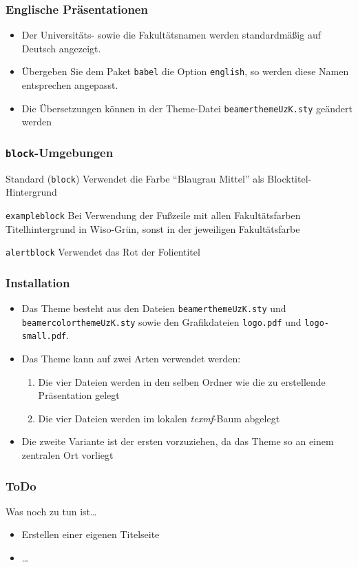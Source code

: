 \documentclass{beamer}
\begin{document}
\begin{frame}
  \frametitle{Englische Präsentationen}
  \begin{itemize}
  \item Der Universitäts- sowie die Fakultätsnamen werden
    standardmäßig auf Deutsch angezeigt.
  \item Übergeben Sie dem Paket \texttt{babel} die Option
    \texttt{english}, so werden diese Namen entsprechen angepasst.
  \item Die Übersetzungen können in der Theme-Datei
    \texttt{beamerthemeUzK.sty} geändert werden
  \end{itemize}

\end{frame}

\begin{frame}
  \frametitle{\texttt{block}-Umgebungen}
  \begin{block}{Standard (\texttt{block})}
    Verwendet die Farbe "`Blaugrau Mittel"' als Blocktitel-Hintergrund
  \end{block}

  \begin{exampleblock}{\texttt{exampleblock}}
    Bei Verwendung der Fußzeile mit allen Fakultätsfarben
    Titelhintergrund in Wiso-Grün, sonst in der jeweiligen
    Fakultätsfarbe
  \end{exampleblock}

  \begin{alertblock}{\texttt{alertblock}}
    Verwendet das Rot der Folientitel
  \end{alertblock}

\end{frame}


\begin{frame}
  \frametitle{Installation}
  \begin{itemize}
  \item Das Theme besteht aus den Dateien
    \texttt{beamerthemeUzK.sty} und \texttt{beamercolorthemeUzK.sty}
    sowie den Grafikdateien \texttt{logo.pdf} und
    \texttt{logo-small.pdf}.
  \item Das Theme kann auf zwei Arten verwendet werden:
    \begin{enumerate}
    \item Die vier Dateien werden in den selben Ordner wie die zu
      erstellende Präsentation gelegt
    \item Die vier Dateien werden im lokalen \emph{texmf}-Baum abgelegt
    \end{enumerate}
  \item Die zweite Variante ist der ersten vorzuziehen, da das Theme
    so an einem zentralen Ort vorliegt
  \end{itemize}
\end{frame}


\begin{frame}
  \frametitle{ToDo}

  \begin{block}{Was noch zu tun ist\ldots}
    \begin{itemize}
    \item Erstellen einer eigenen Titelseite
    \item \ldots
    \end{itemize}
  \end{block}

\end{frame}
\end{document}
